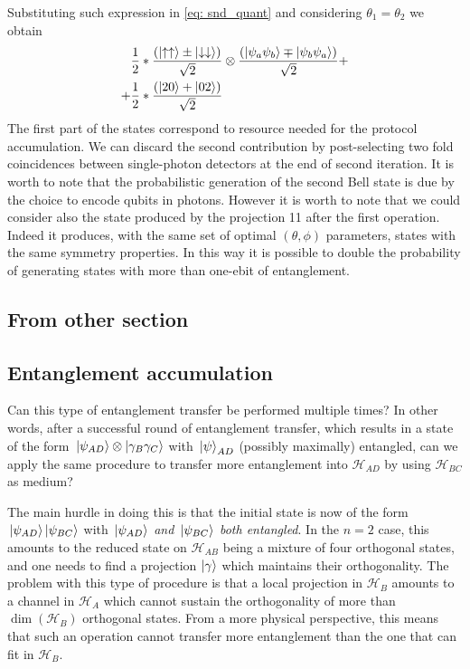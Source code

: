 \documentclass[
	aps, pra,
	superscriptaddress, twocolumn,
	floatfix,
	10pt
]{revtex4-1}
\newcommand{\parTitle}[1]{\noindent{\color{Mahogany}(\emph{#1})}}
\newcommand{\calH}{{\mathcal{H}}}
\begin{document}
Substituting such expression in \cref{eq: snd_quant} and considering $\theta_1 = \theta_2$ we obtain 
\begin{align}
\frac{1}{2}& * \frac{\left( \ket{\uparrow \uparrow} \pm
\ket{\downarrow \downarrow}\right) }{\sqrt{2}}\otimes \frac{\left( \ket{\psi_a \psi_b} \mp
\ket{\psi_b \psi_a}\right) }{\sqrt{2}} +\notag\\
+\frac{1}{2}& *\frac{\left( \ket{20} +
\ket{02}\right) }{\sqrt{2}}
\end{align}
The first part of the states correspond to resource needed for the protocol accumulation. We can discard the second contribution by post-selecting two fold coincidences between single-photon detectors at the end of second iteration. It is worth to note that the probabilistic generation of the second Bell state is due by the choice to encode qubits in photons. However it is worth to note that we could consider also the state  produced by the projection 11 after the first operation. Indeed it produces, with the same set of optimal $(\theta, \phi)$ parameters, states with the same symmetry properties. In this way it is possible to double the probability of generating states with more than one-ebit of entanglement.

\subsection{From other section}
\subsection{Entanglement accumulation}

\parTitle{The question}
Can this type of entanglement transfer be performed multiple times?
In other words, after a successful round of entanglement transfer, which results in a state of the form $\ket*{\psi_{AD}}\otimes\ket{\gamma_B\gamma_C}$
with $\ket*\psi_{AD}$ (possibly maximally) entangled,
can we apply the same procedure to transfer more entanglement into $\calH_{AD}$ by using $\calH_{BC}$ as medium?

\parTitle{Why it is hard}
The main hurdle in doing this is that the initial state is now of the form
$\ket*{\psi_{AD}}\ket{\psi_{BC}}$ with \emph{$\ket*{\psi_{AD}}$ and $\ket*{\psi_{BC}}$ both entangled}.
In the $n=2$ case, this amounts to the reduced state on $\calH_{AB}$ being a mixture of four orthogonal states, and one needs to find a projection $\ket\gamma$ which maintains their orthogonality.
The problem with this type of procedure is that a local projection in $\calH_B$ amounts to a channel in $\calH_A$ which cannot sustain the orthogonality of more than $\dim(\calH_B)$ orthogonal states. From a more physical perspective, this means that such an operation cannot transfer more entanglement than the one that can fit in $\calH_B$.
\end{document}

